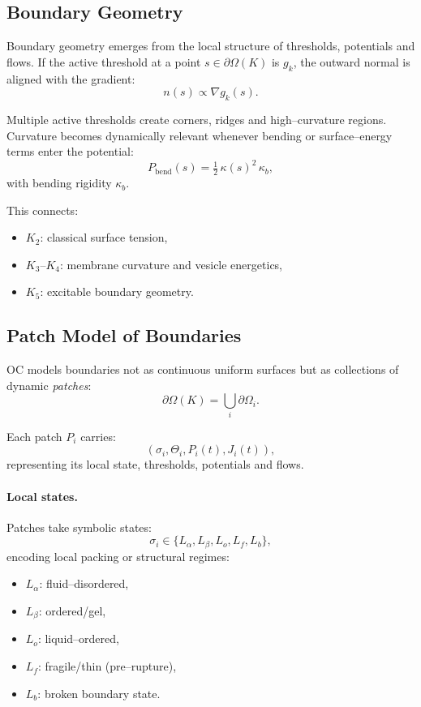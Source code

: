 \subsection{Boundary Geometry}

Boundary geometry emerges from the local structure of thresholds, potentials
and flows.
If the active threshold at a point \(s \in \partial\Omega(K)\) is \(g_k\), the
outward normal is aligned with the gradient:
\[
  n(s) \propto \nabla g_k(s).
\]

Multiple active thresholds create corners, ridges and high–curvature regions.
Curvature becomes dynamically relevant whenever bending or surface–energy
terms enter the potential:
\[
  P_{\mathrm{bend}}(s) = \tfrac{1}{2}\,\kappa(s)^2\,\kappa_b,
\]
with bending rigidity \(\kappa_b\).

This connects:
\begin{itemize}
    \item \(K_2\): classical surface tension,
    \item \(K_3\)–\(K_4\): membrane curvature and vesicle energetics,
    \item \(K_5\): excitable boundary geometry.
\end{itemize}

\subsection{Patch Model of Boundaries}

OC models boundaries not as continuous uniform surfaces but as collections of
dynamic \emph{patches}:
\[
  \partial\Omega(K) = \bigcup_i \partial\Omega_i.
\]

Each patch \(P_i\) carries:
\[
  (\sigma_i,\Theta_i,P_i(t),J_i(t)),
\]
representing its local state, thresholds, potentials and flows.

\paragraph{Local states.}
Patches take symbolic states:
\[
  \sigma_i \in \{L_\alpha, L_\beta, L_o, L_f, L_b\},
\]
encoding local packing or structural regimes:
\begin{itemize}
    \item \(L_\alpha\): fluid–disordered,
    \item \(L_\beta\): ordered/gel,
    \item \(L_o\): liquid–ordered,
    \item \(L_f\): fragile/thin (pre–rupture),
    \item \(L_b\): broken boundary state.
\end{itemize}

